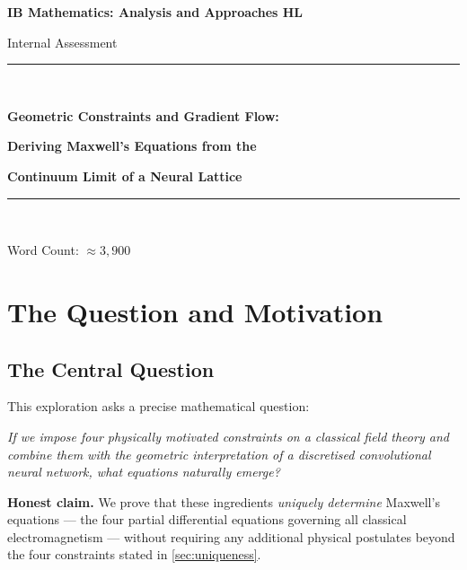 \documentclass[12pt, a4paper]{article}
\theoremstyle{plain}
\theoremstyle{definition}
\theoremstyle{remark}
\begin{document}

\begin{titlepage}
  \centering
  \vspace*{2cm}
  {\Large \textbf{IB Mathematics: Analysis and Approaches HL} \par}
  \vspace{0.5cm}
  {\large Internal Assessment \par}
  \vspace{2cm}
  \rule{\linewidth}{0.5pt}\\[0.6em]
  {\LARGE \textbf{Geometric Constraints and Gradient Flow:} \par}
  \vspace{0.4cm}
  {\LARGE \textbf{Deriving Maxwell's Equations from the} \par}
  \vspace{0.4cm}
  {\LARGE \textbf{Continuum Limit of a Neural Lattice} \par}
  \rule{\linewidth}{0.5pt}\\[3em]
  {\large Word Count: $\approx 3{,}900$ \par}
  \vspace{4cm}
  \vfill
\end{titlepage}

\tableofcontents
\newpage

\section{The Question and Motivation}

\subsection{The Central Question}

This exploration asks a precise mathematical question:

\begin{center}
\textit{If we impose four physically motivated constraints on a classical field theory and
combine them with the geometric interpretation of a discretised convolutional
neural network, what equations naturally emerge?}
\end{center}

\textbf{Honest claim.}  We prove that these ingredients \emph{uniquely determine} Maxwell's equations — the four partial differential equations governing all classical electromagnetism — without requiring any additional physical postulates beyond the four constraints stated in \cref{sec:uniqueness}.
\end{document}
